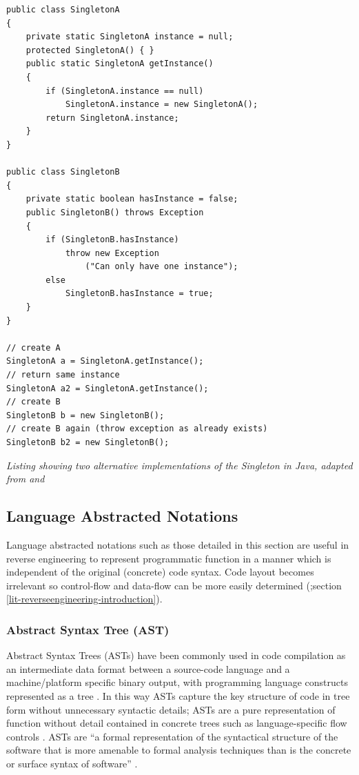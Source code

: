 \begin{lstlisting}
public class SingletonA
{
    private static SingletonA instance = null;
    protected SingletonA() { }
    public static SingletonA getInstance()
    {
        if (SingletonA.instance == null)
            SingletonA.instance = new SingletonA();
        return SingletonA.instance;
    }
}

public class SingletonB 
{
    private static boolean hasInstance = false;
    public SingletonB() throws Exception
    {
        if (SingletonB.hasInstance)
            throw new Exception
                ("Can only have one instance");
        else
            SingletonB.hasInstance = true;
    }    
}

// create A
SingletonA a = SingletonA.getInstance(); 
// return same instance
SingletonA a2 = SingletonA.getInstance(); 
// create B
SingletonB b = new SingletonB();
// create B again (throw exception as already exists)
SingletonB b2 = new SingletonB();
\end{lstlisting}
\textit{Listing showing two alternative implementations of the Singleton in Java, adapted from \cite{gamma1995design} and \cite{uchiyama2011design}}

\subsection{Language Abstracted Notations}\label{lit-reverseengineering-abstractnotation}

Language abstracted notations such as those detailed in this section are useful in reverse engineering to represent programmatic function in a manner which is independent of the original (concrete) code syntax. Code layout becomes irrelevant so control-flow and data-flow can be more easily determined (\cite{fischer2007abstract};section \ref{lit-reverseengineering-introduction}).

\subsubsection{Abstract Syntax Tree (AST)}\label{lit-reverseengineering-ast}

Abstract Syntax Trees (ASTs) have been commonly used in code compilation as an intermediate data format between a source-code language and a machine/platform specific binary output, with programming language constructs represented as a tree \citep{fischer2007abstract,omgastm}. In this way ASTs capture the key structure of code in tree form without unnecessary syntactic details; ASTs are a pure representation of function without detail contained in concrete trees such as language-specific flow controls \citep{jones2003abstract}. ASTs are ``a formal representation of the syntactical structure of the software that is more amenable to formal analysis techniques than is the concrete or surface syntax of software'' \citep{omgastm}.

